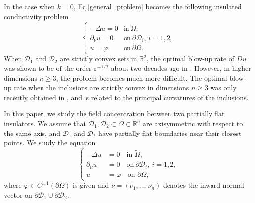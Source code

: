 \documentclass[reqno, 10pt]{amsart}
\theoremstyle{plain}
\theoremstyle{definition}
\theoremstyle{remark}
\numberwithin{equation}{section}
\newcommand{\bR}{\mathbb{R}}
\newcommand\cD{\mathcal{D}}
\begin{document}
In the case when $k=0$, Eq.\eqref{general_problem} becomes the following insulated conductivity problem
\begin{equation*}%
\begin{cases}
-\Delta u =0&\mbox{in}~\widetilde\Omega,\\
\partial_\nu u  = 0 &\mbox{on}~\partial \cD_i, \,i = 1,2,\\
u=\varphi&\mbox{on}~\partial\Omega.
\end{cases}
\end{equation*}
When $\cD_1$ and $\cD_2$ are strictly convex sets in $\bR^2$, the optimal blow-up rate of $Du$ was shown to be of the order $\varepsilon^{-1/2}$ about two decades ago in \cites{AKL,AKLLL}. However, in higher dimensions $n\ge 3$, the problem becomes much more difficult. The optimal blow-up rate when the inclusions are strictly convex in dimensions $n\ge 3$ was only recently obtained in \cites{DLY,DLY2,li2024optimalgradientestimatesinsulated}, and is related to the principal curvatures of the inclusions. 

In this paper, we study the field concentration between two partially flat insulators. We assume that $\mathcal{D}_{1},\mathcal{D}_{2}\subset\Omega \subset \bR^n$ are axisymmetric with respect to the same axis, and $\cD_1$ and $\cD_2$ have partially flat boundaries near their closest points. We study the equation
\begin{equation}\label{equzero}
\left\{
\begin{aligned}
-\Delta u &=0 \quad \mbox{in }\widetilde{\Omega},\\
\partial_\nu u &= 0 \quad \mbox{on}~\partial\mathcal{D}_{i},~i=1,2,\\
 u &= \varphi \quad \mbox{on } \partial \Omega,
\end{aligned}
\right.
\end{equation}
where $\varphi\in{C}^{1,1}(\partial\Omega)$ is given and $\nu = (\nu_1, \ldots, \nu_n)$ denotes the inward normal vector on $\partial\mathcal{D}_{1} \cup \partial\mathcal{D}_{2}$.
\end{document}
